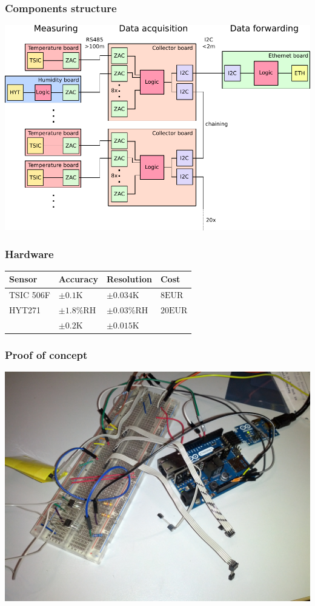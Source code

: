 \documentclass[t]{beamer}
\begin{document}
\begin{frame}[c]
    \frametitle{Components structure}
  \begin{center}
  	\includegraphics[width=0.9\linewidth]{img/plan2_color.pdf}\\
  \vspace{0.5cm}
  \end{center}
\end{frame}
\begin{frame}[c]
    \frametitle{Hardware}
\begin{tabular}{ M M M M}
	Sensor & Accuracy & Resolution & Cost\tabularnewline
	\hline
	\hline
	TSIC 506F& $\pm 0.1\mathrm{K}$ & $\pm 0.034\mathrm{K}$ & $8 \mathrm{EUR}$\tabularnewline
	\hline
	HYT271 & $\pm 1.8\mathrm{\%RH}$ & $\pm 0.03\mathrm{\%RH}$ & $20 \mathrm{EUR}$\tabularnewline
	& $\pm 0.2\mathrm{K}$ & $\pm 0.015\mathrm{K}$ & \tabularnewline
	\hline
\end{tabular}
\end{frame}
\begin{frame}[c]
    \frametitle{Proof of concept}
  \begin{center}
  	\includegraphics[width=0.8\linewidth]{img/pic/IMG_20140410_213954.jpg}\\
  \vspace{0.5cm}
  \end{center}
\end{frame}
\end{document}
